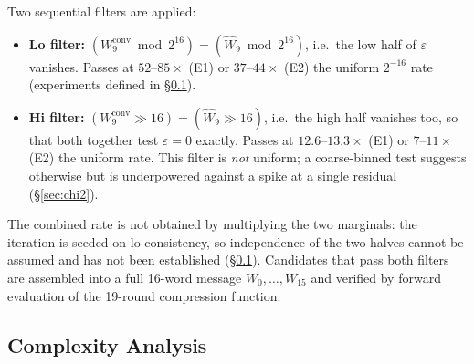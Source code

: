 \documentclass[11pt,a4paper]{article}
\begin{document}
Two sequential filters are applied:
\begin{itemize}
  \item \textbf{Lo filter:}
    $(W_9^{\mathrm{conv}} \bmod 2^{16}) = (\hat{W}_9 \bmod 2^{16})$,
    i.e.\ the low half of $\varepsilon$ vanishes.
    Passes at $52$--$85\times$ (E1) or $37$--$44\times$ (E2) the uniform
    $2^{-16}$ rate (experiments defined in \S\ref{sec:complexity}).
  \item \textbf{Hi filter:}
    $(W_9^{\mathrm{conv}} \gg 16) = (\hat{W}_9 \gg 16)$, i.e.\ the high
    half vanishes too, so that both together test $\varepsilon=0$ exactly.
    Passes at $12.6$--$13.3\times$ (E1) or $7$--$11\times$ (E2) the uniform
    rate.  This filter is
    \emph{not} uniform; a coarse-binned test suggests otherwise but is
    underpowered against a spike at a single residual (\S\ref{sec:chi2}).
\end{itemize}
The combined rate is not obtained by multiplying the two marginals: the
iteration is seeded on lo-consistency, so independence of the two halves
cannot be assumed and has not been established (\S\ref{sec:complexity}).  Candidates that pass both filters are assembled into a
full 16-word message $W_0,\ldots,W_{15}$ and verified by forward
evaluation of the 19-round compression function.

\subsection{Complexity Analysis}
\label{sec:complexity}
\end{document}

